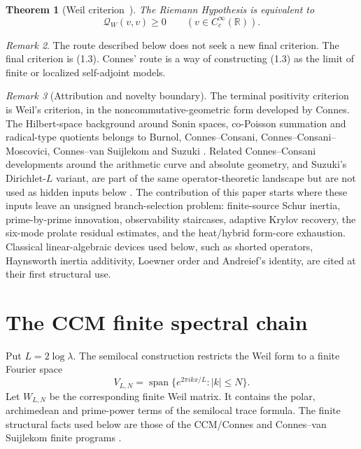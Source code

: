 \documentclass[11pt]{amsart}
\newtheorem{theorem}{Theorem}[section]
\theoremstyle{definition}
\theoremstyle{remark}
\newtheorem{remark}[theorem]{Remark}
\newcommand{\R}{\mathbb R}
\newcommand{\QW}{\mathcal Q_W}
\begin{document}
\begin{theorem}[Weil criterion~\cite{Weil1952,Connes1999}]
\label{thm:weil}
The Riemann Hypothesis is equivalent to
\[
 \QW(v,v)\ge0
 \qquad(v\in C_c^\infty(\R)).
\tag{1.3}
\]
\end{theorem}

\begin{remark}
The route described below does not seek a new final criterion.
The final criterion is (1.3).  Connes' route is a way of constructing
(1.3) as the limit of finite or localized self-adjoint models.
\end{remark}

\begin{remark}[Attribution and novelty boundary]
\label{rem:attribution}
The terminal positivity criterion is Weil's criterion, in the
noncommutative-geometric form developed by Connes.  The Hilbert-space
background around Sonin spaces, co-Poisson summation and radical-type
quotients belongs to Burnol, Connes--Consani,
Connes--Consani--Moscovici, Connes--van Suijlekom and Suzuki
\cite{Burnol2004,Burnol2007,CCArch,CCM2025,CvS2025,Suzuki2025,SuzukiScrew}.
Related Connes--Consani developments around the arithmetic curve and
absolute geometry, and Suzuki's Dirichlet-\(L\) variant, are part of the
same operator-theoretic landscape but are not used as hidden inputs below
\cite{CCJacobian,CCAbsolute,SuzukiDirichlet}.
The contribution of this paper starts where these inputs leave an unsigned branch-selection
problem: finite-source Schur inertia, prime-by-prime innovation,
observability staircases, adaptive Krylov recovery, the six-mode prolate
residual estimates, and the heat/hybrid form-core exhaustion.  Classical
linear-algebraic devices used below, such as shorted operators,
Haynsworth inertia additivity, Loewner order and Andreief's identity, are
cited at their first structural use.
\end{remark}

\section{The CCM finite spectral chain}

Put \(L=2\log\lambda\).  The semilocal construction restricts the Weil form
to a finite Fourier space
\[
 V_{L,N}=\operatorname{span}\{e^{2\pi ikx/L}: |k|\le N\}.
\tag{2.1}
\]
Let \(W_{L,N}\) be the corresponding finite Weil matrix.  It contains the
polar, archimedean and prime-power terms of the semilocal trace formula.
The finite structural facts used below are those of the CCM/Connes and Connes--van Suijlekom finite programs
\cite{CCM2025,Connes2026,CvS2025}.
\end{document}
